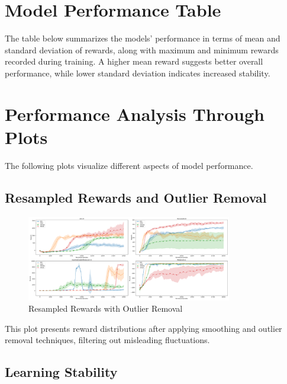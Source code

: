 \documentclass{svproc}
\begin{document}

\section{Model Performance Table}

The table below summarizes the models' performance in terms of mean and standard deviation of rewards, along with maximum and minimum rewards recorded during training. A higher mean reward suggests better overall performance, while lower standard deviation indicates increased stability.

\bigskip
\begin{center}
  
\end{center}
\bigskip

\section{Performance Analysis Through Plots}

The following plots visualize different aspects of model performance.

\subsection{Resampled Rewards and Outlier Removal}

\begin{figure}[H]
    \centering
    \includegraphics[width=0.8\textwidth]{.assets/resampled_outlier.png}
    \caption{Resampled Rewards with Outlier Removal}
\end{figure}

This plot presents reward distributions after applying smoothing and outlier removal techniques, filtering out misleading fluctuations.

\subsection{Learning Stability}
\end{document}
